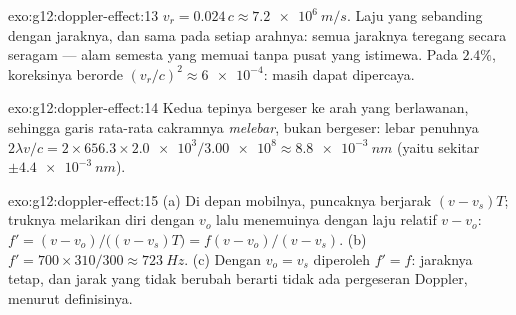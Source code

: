 \begin{solution}{exo:g12:doppler-effect:13}
$v_r = 0.024\,c \approx \qty{7.2e6}{m/s}$. Laju yang sebanding dengan jaraknya, dan sama
pada setiap arahnya: semua jaraknya teregang secara seragam --- alam semesta yang memuai
tanpa pusat yang istimewa. Pada $2.4\%$, koreksinya berorde
$(v_r/c)^2 \approx
\num{6e-4}$: masih dapat dipercaya.
\end{solution}

\begin{solution}{exo:g12:doppler-effect:14}
Kedua tepinya bergeser ke arah yang berlawanan, sehingga garis rata-rata cakramnya
\emph{melebar}, bukan bergeser: lebar penuhnya
$2\lambda v/c = 2 \times 656.3 \times \num{2.0e3}/\num{3.00e8}
\approx \qty{8.8e-3}{nm}$
(yaitu sekitar $\pm\qty{4.4e-3}{nm}$).
\end{solution}

\begin{solution}{exo:g12:doppler-effect:15}
(a) Di depan mobilnya, puncaknya berjarak $(v - v_s)T$; truknya melarikan diri dengan
$v_o$ lalu menemuinya dengan laju relatif $v - v_o$:
$f' = (v - v_o)/\bigl((v - v_s)T\bigr) =
f(v - v_o)/(v - v_s)$.
(b) $f' = 700 \times 310/300 \approx \qty{723}{Hz}$. (c) Dengan $v_o = v_s$ diperoleh
$f' = f$: jaraknya tetap, dan jarak yang tidak berubah berarti tidak ada pergeseran
Doppler, menurut definisinya.
\end{solution}

